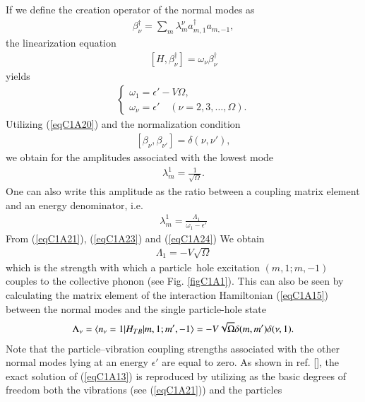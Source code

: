 If we define the creation operator of the normal modes as
 \begin{align}\label{eqC1A19} 
\beta^\dagger_\nu=\sum_m \lambda_m^\nu a_{m,1}^\dagger a_{m,-1},
 \end{align}
the linearization equation
 \begin{align}\label{eqC1A20} 
[H,\beta_\nu^\dagger]=\omega_\nu\beta^\dagger_\nu
 \end{align}
yields
 \begin{align}\label{eqC1A21} 
\left\{\begin{array}{l}
 \omega_1=\epsilon'-V\Omega,\\ 
\omega_\nu=\epsilon'\quad (\nu=2,3,\dots,\Omega).
\end{array} \right.
 \end{align}
Utilizing (\ref{eqC1A20}) and the normalization condition
 \begin{align}\label{eqC1A22} 
[\beta_\nu,\beta_{\nu'}]=\delta(\nu,\nu'),
 \end{align}
we obtain for the amplitudes associated with the lowest mode
 \begin{align}\label{eqC1A23} 
\lambda_m^1=\frac{1}{\sqrt{\Omega}}.
 \end{align}
One can also write this amplitude as the ratio between a coupling matrix
element and an energy denominator, i.e.
 \begin{align}\label{eqC1A24} 
\lambda_m^1=\frac{\Lambda_1}{\omega_1-\epsilon'}
 \end{align}
From (\ref{eqC1A21}), (\ref{eqC1A23}) and (\ref{eqC1A24}) We obtain
 \begin{align}\label{eqC1A25} 
\Lambda_1=-V\sqrt{\Omega}
 \end{align}
which is the strength with which a particle~hole excitation $(m, 1; m, -1)$
couples to the collective phonon (see Fig. \ref{figC1A1}). This can also be seen by calculating
the matrix element of the interaction Hamiltonian (\ref{eqC1A15}) between the normal
modes and the single particle-hole state
 \begin{align}\label{eqC1A26} 
\Lambda_\nu=\langle {n_\nu=1|H_{TB}|m,1;m',-1} \rangle=-V\sqrt{\Omega}\delta(m,m')\delta(\nu,1).
 \end{align}
Note that the particle--vibration coupling strengths associated with the other
normal modes lying at an energy $\epsilon'$ are equal to zero.
As shown in ref. [\cite{Bes:74,Broglia:76}], the exact solution of (\ref{eqC1A13}) is reproduced by utilizing
as the basic degrees of freedom both the vibrations (see (\ref{eqC1A21})) and the particles
